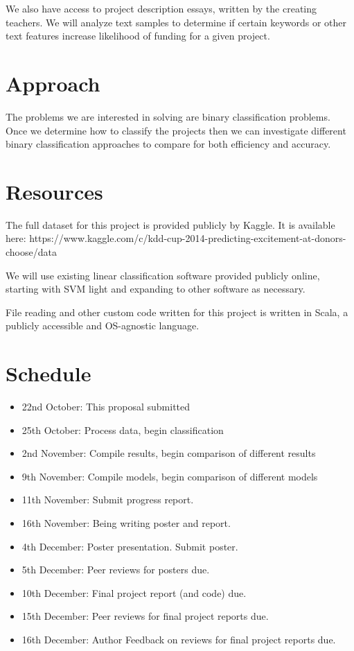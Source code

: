 \documentclass{article}
\begin{document}
We also have access to project description essays, written by the creating teachers. We will analyze text samples to determine if certain keywords or other text features increase likelihood of funding for a given project.
\section{Approach}
The problems we are interested in solving are binary classification problems.  Once we determine how to classify the projects then we can investigate different binary classification approaches to compare for both efficiency and accuracy.
\section{Resources}
The full dataset for this project is provided publicly by Kaggle. It is available here: https://www.kaggle.com/c/kdd-cup-2014-predicting-excitement-at-donors-choose/data

We will use existing linear classification software provided publicly online, starting with SVM light and expanding to other software as necessary.

File reading and other custom code written for this project is written in Scala, a publicly accessible and OS-agnostic language.
\section{Schedule}

\begin{itemize}
\item 22nd October: This proposal submitted
\item 25th October: Process data, begin classification
\item 2nd November: Compile results, begin comparison of different results
\item 9th November: Compile models, begin comparison of different models
\item 11th November: Submit progress report.
\item 16th November: Being writing poster and report.
\item 4th December: Poster presentation. Submit poster.
\item 5th December: Peer reviews for posters due.
\item 10th December: Final project report (and code) due.
\item 15th December: Peer reviews for final project reports due.
\item 16th December: Author Feedback on reviews for final project reports due.
\end{itemize}
\end{document}
